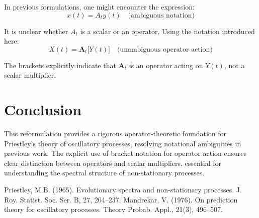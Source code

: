 \documentclass{article}
\begin{document}
In previous formulations, one might encounter the expression:
\begin{equation}
x(t) = A_t y(t) \quad \text{(ambiguous notation)}
\end{equation}

It is unclear whether $A_t$ is a scalar or an operator. Using the notation introduced here:
\begin{equation}
X(t) = \mathbf{A}_t\big[Y(t)\big] \quad \text{(unambiguous operator action)}
\end{equation}

The brackets explicitly indicate that $\mathbf{A}_t$ is an operator acting on $Y(t)$, not a scalar multiplier.

\section{Conclusion}

This reformulation provides a rigorous operator-theoretic foundation for Priestley's theory of oscillatory processes, resolving notational ambiguities in previous work. The explicit use of bracket notation for operator action ensures clear distinction between operators and scalar multipliers, essential for understanding the spectral structure of non-stationary processes.

\begin{thebibliography}{9}
 Priestley, M.B. (1965). Evolutionary spectra and non-stationary processes. J. Roy. Statist. Soc. Ser. B, 27, 204–237.
 Mandrekar, V. (1976). On prediction theory for oscillatory processes. Theory Probab. Appl., 21(3), 496–507.
\end{thebibliography}
\end{document}
